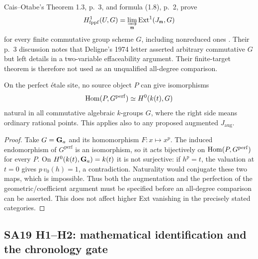Cais--Otabe's Theorem 1.3, p.~3, and formula (1.8), p.~2,
prove
\[H^1_{\mathrm{fppf}}(U,G)=\varinjlim_{\mathfrak m}
\operatorname{Ext}^1(J_{\mathfrak m},G)\]
for every finite commutative group
scheme $G$, including nonreduced ones \cite{CaisOtabe2026}.
Their p.~3 discussion notes that Deligne's 1974 letter asserted
arbitrary commutative $G$ but left details in a two-variable
effaceability argument. Their finite-target theorem is therefore
not used as an unqualified all-degree comparison.

\begin{proposition}
On the perfect \'etale site, no source object $P$ can give
isomorphisms
\[
 \operatorname{Hom}(P,G^{\mathrm{perf}})\simeq H^0(k(t),G)
\]
natural in all commutative algebraic $k$-groups $G$, where the
right side means ordinary rational points. This applies also to
any proposed augmented $J_{\mathrm{aug}}$.
\end{proposition}
\begin{proof}
Take $G=\mathbf G_a$ and its homomorphism $F:x\mapsto x^p$.
The induced endomorphism of $G^{\mathrm{perf}}$ is an isomorphism,
so it acts bijectively on $\operatorname{Hom}(P,G^{\mathrm{perf}})$ for every
$P$. On $H^0(k(t),\mathbf G_a)=k(t)$ it is not surjective: if
$h^p=t$, the valuation at $t=0$ gives $p\,v_0(h)=1$, a
contradiction. Naturality would conjugate these two maps, which
is impossible. Thus both the augmentation and the perfection of
the geometric/coefficient argument must be specified before an
all-degree comparison can be asserted. This does not affect
higher Ext vanishing in the precisely stated categories.
\end{proof}


\subsection{SA19 H1--H2: mathematical identification and the chronology gate}

